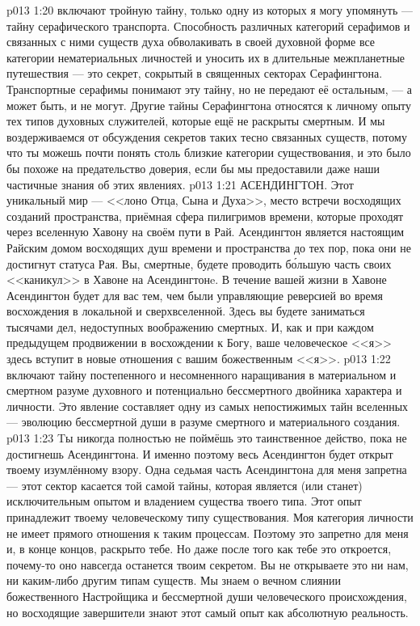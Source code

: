\vs p013 1:20 \pc {} включают тройную тайну, только одну из которых я могу упомянуть --- тайну серафического транспорта. Способность различных категорий серафимов и связанных с ними существ духа обволакивать в своей духовной форме все категории нематериальных личностей и уносить их в длительные межпланетные путешествия --- это секрет, сокрытый в священных секторах Серафингтона. Транспортные серафимы понимают эту тайну, но не передают её остальным, --- а может быть, и не могут. Другие тайны Серафингтона относятся к личному опыту тех типов духовных служителей, которые ещё не раскрыты смертным. И мы воздерживаемся от обсуждения секретов таких тесно связанных существ, потому что ты можешь почти понять столь близкие категории существования, и это было бы похоже на предательство доверия, если бы мы предоставили даже наши частичные знания об этих явлениях.
\vs p013 1:21 АСЕНДИНГТОН. Этот уникальный мир --- <<лоно Отца, Сына и Духа>>, место встречи восходящих созданий пространства, приёмная сфера пилигримов времени, которые проходят через вселенную Хавону на своём пути в Рай. Асендингтон является настоящим Райским домом восходящих душ времени и пространства до тех пор, пока они не достигнут статуса Рая. Вы, смертные, будете проводить б\'ольшую часть своих <<каникул>> в Хавоне на Асендингтонe. В течение вашей жизни в Хавоне Асендингтон будет для вас тем, чем были управляющие реверсией во время восхождения в локальной и сверхвселенной. Здесь вы будете заниматься тысячами дел, недоступных воображению смертных. И, как и при каждом предыдущем продвижении в восхождении к Богу, ваше человеческое <<я>> здесь вступит в новые отношения с вашим божественным <<я>>.
\vs p013 1:22 \pc {} включают тайну постепенного и несомненного наращивания в материальном и смертном разуме духовного и потенциально бессмертного двойника характера и личности. Это явление составляет одну из самых непостижимых тайн вселенных --- эволюцию бессмертной души в разуме смертного и материального создания.
\vs p013 1:23 Tы никогда полностью не поймёшь это таинственное действо, пока не достигнешь Асендингтона. И именно поэтому весь Асендингтон будет открыт твоему изумлённому взору. Одна седьмая часть Асендингтона для меня запретна --- этот сектор касается той самой тайны, которая является (или станет) исключительным опытом и владением существа твоего типа. Этот опыт принадлежит твоему человеческому типу существования. Моя категория личности не имеет прямого отношения к таким процессам. Поэтому это запретно для меня и, в конце концов, раскрыто тебе. Но даже после того как тебе это откроется, почему\hyp{}то оно навсегда останется твоим секретом. Вы не открываете это ни нам, ни каким\hyp{}либо другим типам существ. Мы знаем о вечном слиянии божественного Настройщика и бессмертной души человеческого происхождения, но восходящие завершители знают этот самый опыт как абсолютную реальность.
